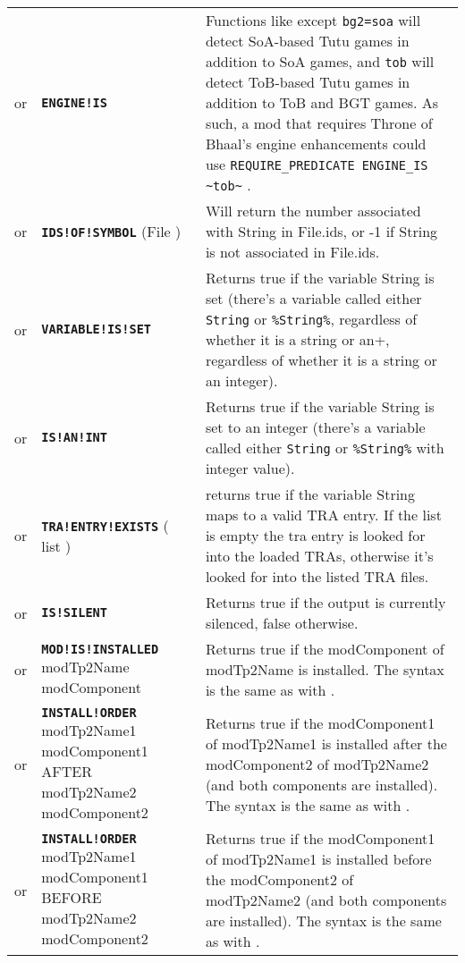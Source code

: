 \documentclass{article}
\def\ttref#1{\ahrefloc{#1}{\tt #1}}
\def\DEFINE#1{{\tt \bf #1}\label{#1}\index{#1}}
\def\DEFSYN#1{{\tt \bf #1}\index{#1}}
\def\Slist{{\color{red} list }}
\begin{document}
\begin{tabular}{cp{10in}|p{10in}}
or & \DEFINE{ENGINE!IS} \ttref{String} & Functions like \ttref{GAME!IS} 
except \verb+bg2=soa+ will detect SoA-based Tutu games in addition to SoA games,
and \verb+tob+ will detect ToB-based Tutu games in addition to ToB and BGT games.
As such, a mod that requires Throne of Bhaal's engine enhancements could use
\verb+REQUIRE_PREDICATE ENGINE_IS ~tob~+ . \\

or & \DEFINE{IDS!OF!SYMBOL} (File \ttref{String}) &
Will return the number associated with String in File.ids,
or -1 if String is not associated in File.ids. \\

or & \DEFINE{VARIABLE!IS!SET} \ttref{String} &
Returns true if the variable String is set (there's a variable called either
\verb+String+ or \verb+%String%+, regardless of whether it is a string or an
integer).  \\

or & \DEFSYN{IS!AN!INT} \ttref{String} &
Returns true if the variable String is set to an integer (there's a variable called either
\verb+String+ or \verb+%String%+ with integer value).  \\
or & \DEFINE{TRA!ENTRY!EXISTS} ( \ttref{String} \ttref{String} \Slist ) &
	returns true if the variable String maps to a valid TRA entry.
	If the \ttref{String} list is empty the tra entry is looked for into the loaded TRAs,
	otherwise it's looked for into the listed TRA files.
\\
or & \DEFSYN{IS!SILENT} &
Returns true if the output is currently silenced, false otherwise.  \\

or & \DEFINE{MOD!IS!INSTALLED} modTp2Name modComponent &
Returns true if the modComponent of modTp2Name is installed. The syntax
is the same as with \ttref {REQUIRE!COMPONENT}.  \\

or & \DEFINE{INSTALL!ORDER} modTp2Name1 modComponent1 AFTER modTp2Name2 modComponent2 &
Returns true if the modComponent1 of modTp2Name1 is installed after the modComponent2
of modTp2Name2 (and both components are installed). The syntax
is the same as with \ttref {REQUIRE!COMPONENT}.  \\

or & \DEFSYN{INSTALL!ORDER} modTp2Name1 modComponent1 BEFORE modTp2Name2 modComponent2 &
Returns true if the modComponent1 of modTp2Name1 is installed before the modComponent2
of modTp2Name2 (and both components are installed). The syntax
is the same as with \ttref {REQUIRE!COMPONENT}.  \\


\end{tabular}
\end{document}
